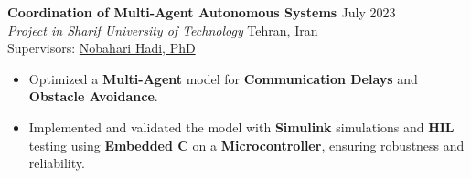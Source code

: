 \documentclass[12pt]{article}
\begin{document}
\vspace{-4pt}

\noindent
{\bfseries Coordination of Multi-Agent Autonomous Systems
\href{https://github.com/alibaniasad1999/Coordination-of-Multi-Agent-Autonomous-Systems}{\faGithub}
} \hfill July 2023 \\
\noindent \textit{Project in Sharif University of Technology} \hfill Tehran, Iran \\
\noindent Supervisors:
\href{https://ae.sharif.edu/~portal/faculty/1091235256}{Nobahari Hadi, PhD}
\vspace{-8pt}
\begin{itemize} \itemsep -4pt %
	\item Optimized a \textbf{Multi-Agent} model for \textbf{Communication Delays} and \textbf{Obstacle Avoidance}.
    \item Implemented and validated the model with \textbf{Simulink} simulations and \textbf{HIL} testing using \textbf{Embedded C} on a \textbf{Microcontroller}, ensuring robustness and reliability.
\end{itemize}
\end{document}
